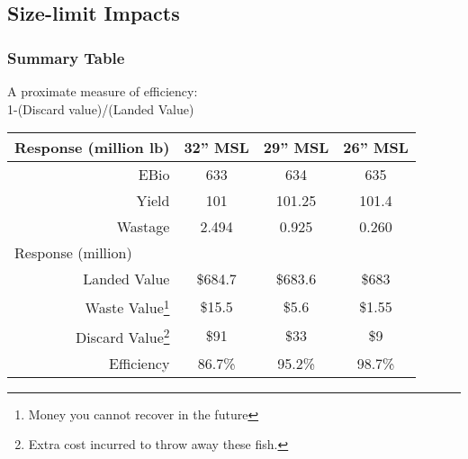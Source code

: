 \documentclass{beamer}
\begin{document}
\subsection{Size-limit Impacts} %
\label{sub:size_limit_impacts}
\begin{frame}[m]\frametitle{Summary Table}
	 {A proximate measure of efficiency: \\ 1-(Discard value)/(Landed Value)}\\\medskip
	\begin{tabular}{r|c|c|c}
		\hline
		\multicolumn{1}{l}{{Response (million lb)}} & {32'' MSL} & {29'' MSL}  & {26'' MSL } \\
		\hline
		EBio       & 633     & 634      & 635    \\
		Yield      & 101     & 101.25   & 101.4  \\
		Wastage      & \alert{2.494}   & \alert{0.925}    & \alert{0.260}  \\
		\hline
		\multicolumn{4}{l}{{Response (million)}}\\
		\hline
		Landed Value     & \$684.7 & \$683.6  & \$683  \\
		\alert{Waste Value\footnote{Money you cannot recover in the future} }
		 & \alert{\$15.5}&\alert{\$5.6} &\alert{\$1.55} \\
		Discard Value\footnote{Extra cost incurred to throw away these fish.}
		& \$91 & \$33 & \$9\\
		\hline \pause \pause
		Efficiency & 86.7\%  & 95.2\% & 98.7\% \\
		\hline
	\end{tabular}
\end{frame}
\end{document}
